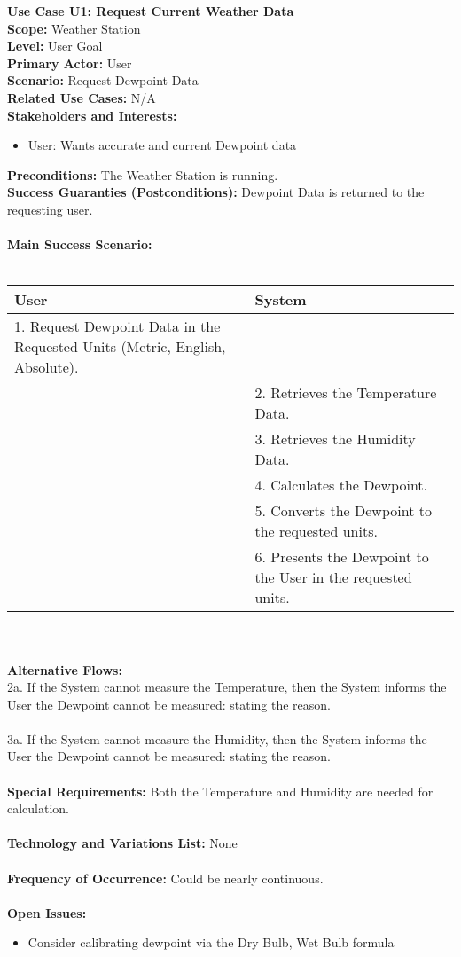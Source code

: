 \documentclass[letterpaper]{article}
\begin{document}
\noindent
\textbf{Use Case U1:  Request Current Weather Data}\\
\textbf{Scope:  }Weather Station\\
\textbf{Level:  }User Goal\\
\textbf{Primary Actor:  }User\\
\textbf{Scenario:  }Request Dewpoint Data\\
\textbf{Related Use Cases:  }N/A\\
\textbf{Stakeholders and Interests:}
\begin{itemize}
\item User:  Wants accurate and current Dewpoint data
\end{itemize}
\textbf{Preconditions:  }The Weather Station is running.\\
\textbf{Success Guaranties  (Postconditions):} 
Dewpoint Data is returned to the requesting user.\\\\
\textbf{Main Success Scenario: }\\\\
\begin{tabular}{|p{6cm}|p{6cm}|}\hline
\textbf{User} & \textbf{System}\\\hline
1.  Request Dewpoint Data in the Requested Units (Metric, English,
Absolute). 
& \\\hline
&2.  Retrieves the Temperature Data.\\\hline
&3.  Retrieves the Humidity Data.\\\hline
&4.  Calculates the Dewpoint.\\\hline
&5.  Converts the Dewpoint to the requested units.\\\hline
&6.  Presents the Dewpoint to the User in the requested units.\\\hline
\end{tabular}\\\\
\textbf{Alternative Flows:  }\\
2a.  If the System cannot measure the Temperature,
then the System informs the User the Dewpoint cannot be measured:
stating the reason.\\\\
3a.  If the System cannot measure the Humidity, then
the System informs the User the Dewpoint cannot be measured:
stating the reason.\\\\
\textbf{Special Requirements:  }Both the Temperature and Humidity
are needed for calculation.\\\\
\textbf{Technology and Variations List:  }None\\\\ 
\textbf{Frequency of Occurrence:  }Could be nearly continuous.\\\\
\textbf{Open Issues:  }
\begin{itemize}
\item Consider calibrating dewpoint via the Dry Bulb, Wet Bulb
formula
\end{itemize}
\end{document}
